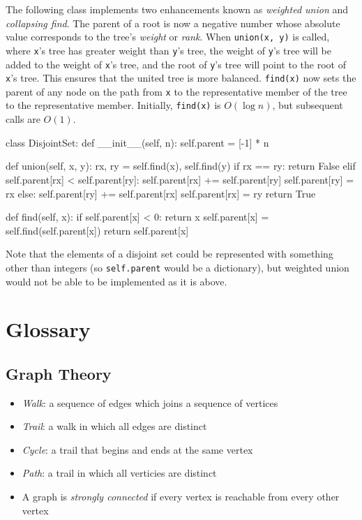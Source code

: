 \documentclass[12pt, titlepage]{article}
\begin{document}
The following class implements two enhancements known as \textit{weighted union} and \textit{collapsing find}. The parent of a root is now a negative number whose absolute value corresponds to the tree's \textit{weight} or \textit{rank}. When \texttt{union(x, y)} is called, where \texttt{x}'s tree has greater weight than \texttt{y}'s tree, the weight of \texttt{y}'s tree will be added to the weight of \texttt{x}'s tree, and the root of \texttt{y}'s tree will point to the root of \texttt{x}'s tree. This ensures that the united tree is more balanced. \texttt{find(x)} now sets the parent of any node on the path from \texttt{x} to the representative member of the tree to the representative member. Initially, \texttt{find(x)} is $O(\log n)$, but subsequent calls are $O(1)$.
\medskip
\begin{python}
class DisjointSet:
    def __init__(self, n):
        self.parent = [-1] * n

    def union(self, x, y):
        rx, ry = self.find(x), self.find(y)
        if rx == ry:
            return False
        elif self.parent[rx] < self.parent[ry]:
            self.parent[rx] += self.parent[ry]
            self.parent[ry] = rx
        else:
            self.parent[ry] += self.parent[rx]
            self.parent[rx] = ry
        return True

    def find(self, x):
        if self.parent[x] < 0:
            return x
        self.parent[x] = self.find(self.parent[x])
        return self.parent[x]
\end{python}
\bigskip

Note that the elements of a disjoint set could be represented with something other than integers (so \texttt{self.parent} would be a dictionary), but weighted union would not be able to be implemented as it is above.

\section{Glossary}

\subsection{Graph Theory}
\begin{itemize}
  \item \textit{Walk}: a sequence of edges which joins a sequence of vertices
  \item \textit{Trail}: a walk in which all edges are distinct
  \item \textit{Cycle}: a trail that begins and ends at the same vertex
  \item \textit{Path}: a trail in which all verticies are distinct
  \item A graph is \textit{strongly connected} if every vertex is reachable from every other vertex
\end{itemize}
\end{document}
